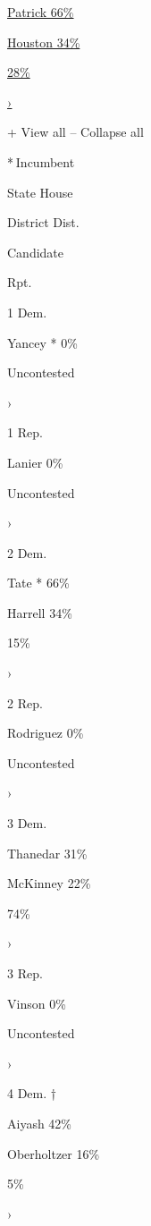 \href{https://www.nytimes3xbfgragh.onion/interactive/2020/08/04/us/elections/results-michigan-house-district-14-primary-election.html}{
Patrick 66\% }

\href{https://www.nytimes3xbfgragh.onion/interactive/2020/08/04/us/elections/results-michigan-house-district-14-primary-election.html}{
Houston 34\% }

\href{https://www.nytimes3xbfgragh.onion/interactive/2020/08/04/us/elections/results-michigan-house-district-14-primary-election.html}{28\%}

\href{https://www.nytimes3xbfgragh.onion/interactive/2020/08/04/us/elections/results-michigan-house-district-14-primary-election.html}{›}

+ View all -- Collapse all

* Incumbent~

State House

District Dist.

Candidate

Rpt.

1 Dem.

Yancey * 0\%

Uncontested

›

1 Rep.

Lanier 0\%

Uncontested

›

2 Dem.

Tate * 66\%

Harrell 34\%

15\%

›

2 Rep.

Rodriguez 0\%

Uncontested

›

3 Dem.

Thanedar 31\%

McKinney 22\%

74\%

›

3 Rep.

Vinson 0\%

Uncontested

›

4 Dem. †

Aiyash 42\%

Oberholtzer 16\%

5\%

›

